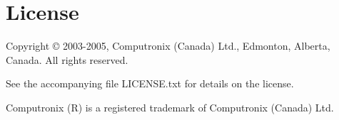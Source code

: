 \chapter{License}

\centerline{}

Copyright \copyright{} 2003-2005, Computronix (Canada) Ltd., Edmonton, Alberta, Canada.
All rights reserved.

See the accompanying file LICENSE.txt for details on the license.

Computronix (R) is a registered trademark of Computronix (Canada) Ltd.

